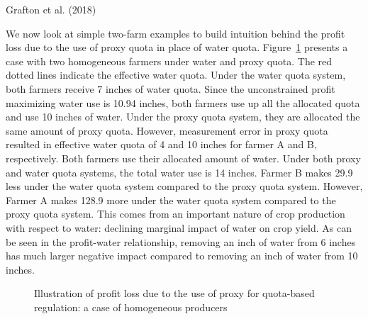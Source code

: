 \documentclass[
  letterpaper,
  DIV=11,
  numbers=noendperiod]{scrartcl}
\begin{document}
Grafton et al. (2018)

We now look at simple two-farm examples to build intuition behind the
profit loss due to the use of proxy quota in place of water quota.
Figure~\ref{fig-illust-homogeneous} presents a case with two homogeneous
farmers under water and proxy quota. The red dotted lines indicate the
effective water quota. Under the water quota system, both farmers
receive 7 inches of water quota. Since the unconstrained profit
maximizing water use is 10.94 inches, both farmers use up all the
allocated quota and use 10 inches of water. Under the proxy quota
system, they are allocated the same amount of proxy quota. However,
measurement error in proxy quota resulted in effective water quota of 4
and 10 inches for farmer A and B, respectively. Both farmers use their
allocated amount of water. Under both proxy and water quota systems, the
total water use is 14 inches. Farmer B makes 29.9 less under the water
quota system compared to the proxy quota system. However, Farmer A makes
128.9 more under the water quota system compared to the proxy quota
system. This comes from an important nature of crop production with
respect to water: declining marginal impact of water on crop yield. As
can be seen in the profit-water relationship, removing an inch of water
from 6 inches has much larger negative impact compared to removing an
inch of water from 10 inches.

\begin{figure}[H]


\caption{\label{fig-illust-homogeneous}Illustration of profit loss due
to the use of proxy for quota-based regulation: a case of homogeneous
producers}

\end{figure}%
\end{document}
